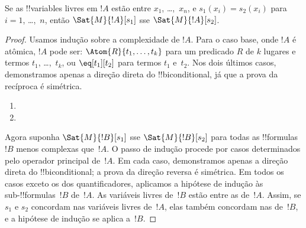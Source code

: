 \documentclass[../../../include/open-logic-section]{subfiles}
\begin{document}
\begin{prop}
Se as !!{variable}s livres em $!A$ estão entre $x_1$, \dots,~$x_n$, e
$s_1(x_i) = s_2(x_i)$ para $i = 1$, \dots,~$n$, então $\Sat{M}{!A}[s_1]$
sse $\Sat{M}{!A}[s_2]$.
\end{prop}

\begin{proof}
Usamos indução sobre a complexidade de $!A$. Para o caso base, onde
$!A$ é atômica, $!A$ pode ser:
$\Atom{R}{t_1, \dots, t_k}$ para um predicado $R$ de $k$ lugares e termos
$t_1$, \dots,~$t_k$, ou $\eq[t_1][t_2]$ para termos $t_1$ e~$t_2$.
Nos dois últimos casos, demonstramos apenas a direção direta do
!!{biconditional}, já que a prova da recíproca é simétrica.

\begin{enumerate}


\item
\item
\end{enumerate}

Agora suponha $\Sat{M}{!B}[s_1]$ sse $\Sat{M}{!B}[s_2]$ para todas as
!!{formula}s $!B$ menos complexas que~$!A$. O passo de indução procede
por casos determinados pelo operador principal de~$!A$. Em cada caso,
demonstramos apenas a direção direta do !!{biconditional}; a
prova da direção reversa é simétrica. Em todos os casos exceto
os dos quantificadores, aplicamos a hipótese de indução às
sub-!!{formula}s~$!B$ de~$!A$.  As variáveis livres de~$!B$ estão entre
as de~$!A$. Assim, se $s_1$ e $s_2$ concordam nas variáveis livres
de~$!A$, elas também concordam nas de~$!B$, e a hipótese de indução
se aplica a~$!B$.


\end{proof}
\end{document}
